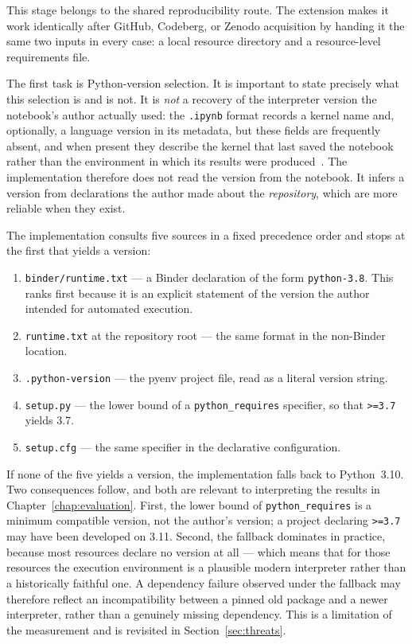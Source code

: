 This stage belongs to the shared reproducibility route. The extension makes it work identically after GitHub, Codeberg, or Zenodo acquisition by handing it the same two inputs in every case: a local resource directory and a resource-level requirements file.

The first task is Python-version selection. It is important to state precisely what this selection is and is not. It is \emph{not} a recovery of the interpreter version the notebook's author actually used: the \texttt{.ipynb} format records a kernel name and, optionally, a language version in its metadata, but these fields are frequently absent, and when present they describe the kernel that last saved the notebook rather than the environment in which its results were produced~\cite{nbformat}. The implementation therefore does not read the version from the notebook. It infers a version from declarations the author made about the \emph{repository}, which are more reliable when they exist.

The implementation consults five sources in a fixed precedence order and stops at the first that yields a version:

\begin{enumerate}[label=\arabic*.,leftmargin=1.2cm,itemsep=0.15em,topsep=0.2em]
\item \texttt{binder/runtime.txt} --- a Binder declaration of the form \texttt{python-3.8}. This ranks first because it is an explicit statement of the version the author intended for automated execution.
\item \texttt{runtime.txt} at the repository root --- the same format in the non-Binder location.
\item \texttt{.python-version} --- the pyenv project file, read as a literal version string.
\item \texttt{setup.py} --- the lower bound of a \texttt{python\_requires} specifier, so that \texttt{>=3.7} yields 3.7.
\item \texttt{setup.cfg} --- the same specifier in the declarative configuration.
\end{enumerate}

If none of the five yields a version, the implementation falls back to Python~3.10. Two consequences follow, and both are relevant to interpreting the results in Chapter~\ref{chap:evaluation}. First, the lower bound of \texttt{python\_requires} is a minimum compatible version, not the author's version; a project declaring \texttt{>=3.7} may have been developed on 3.11. Second, the fallback dominates in practice, because most resources declare no version at all --- which means that for those resources the execution environment is a plausible modern interpreter rather than a historically faithful one. A dependency failure observed under the fallback may therefore reflect an incompatibility between a pinned old package and a newer interpreter, rather than a genuinely missing dependency. This is a limitation of the measurement and is revisited in Section~\ref{sec:threats}.

